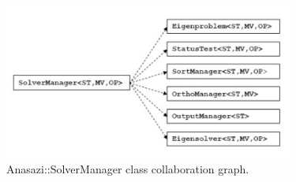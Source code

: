 \documentclass[acmtoms]{acmtrans2m}
\begin{document}
\begin{figure}[htb]
\label{fig:solverColl}
\begin{center}
\includegraphics[height=2in]{anasazi_slvr_collaborations.pdf}
\end{center}
\caption{Anasazi::SolverManager class collaboration graph.}
\end{figure}
\end{document}
